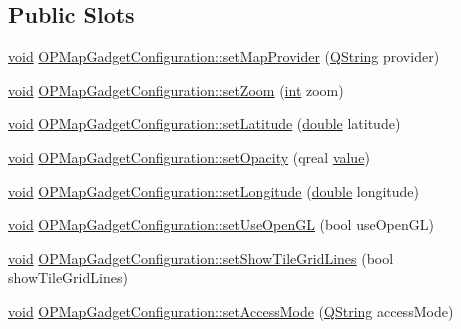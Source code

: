 \subsection*{Public Slots}
\begin{DoxyCompactItemize}
\item 
\hyperlink{group___u_a_v_objects_plugin_ga444cf2ff3f0ecbe028adce838d373f5c}{void} \hyperlink{group___o_p_map_plugin_gadde204abdb010d3db3f74c441e3b5f86}{O\-P\-Map\-Gadget\-Configuration\-::set\-Map\-Provider} (\hyperlink{group___u_a_v_objects_plugin_gab9d252f49c333c94a72f97ce3105a32d}{Q\-String} provider)
\item 
\hyperlink{group___u_a_v_objects_plugin_ga444cf2ff3f0ecbe028adce838d373f5c}{void} \hyperlink{group___o_p_map_plugin_ga890d5cb95e80f44a580a0e3ed6ff3be7}{O\-P\-Map\-Gadget\-Configuration\-::set\-Zoom} (\hyperlink{ioapi_8h_a787fa3cf048117ba7123753c1e74fcd6}{int} zoom)
\item 
\hyperlink{group___u_a_v_objects_plugin_ga444cf2ff3f0ecbe028adce838d373f5c}{void} \hyperlink{group___o_p_map_plugin_gab759e5b231114788ee1e2e86fcbdec91}{O\-P\-Map\-Gadget\-Configuration\-::set\-Latitude} (\hyperlink{_super_l_u_support_8h_a8956b2b9f49bf918deed98379d159ca7}{double} latitude)
\item 
\hyperlink{group___u_a_v_objects_plugin_ga444cf2ff3f0ecbe028adce838d373f5c}{void} \hyperlink{group___o_p_map_plugin_gac8ae59a00d15d1f1134b3908d4467567}{O\-P\-Map\-Gadget\-Configuration\-::set\-Opacity} (qreal \hyperlink{glext_8h_aa0e2e9cea7f208d28acda0480144beb0}{value})
\item 
\hyperlink{group___u_a_v_objects_plugin_ga444cf2ff3f0ecbe028adce838d373f5c}{void} \hyperlink{group___o_p_map_plugin_ga325a0c461cf8655200b500b27c814250}{O\-P\-Map\-Gadget\-Configuration\-::set\-Longitude} (\hyperlink{_super_l_u_support_8h_a8956b2b9f49bf918deed98379d159ca7}{double} longitude)
\item 
\hyperlink{group___u_a_v_objects_plugin_ga444cf2ff3f0ecbe028adce838d373f5c}{void} \hyperlink{group___o_p_map_plugin_gab274a818972885ce68aba549d8d6c683}{O\-P\-Map\-Gadget\-Configuration\-::set\-Use\-Open\-G\-L} (bool use\-Open\-G\-L)
\item 
\hyperlink{group___u_a_v_objects_plugin_ga444cf2ff3f0ecbe028adce838d373f5c}{void} \hyperlink{group___o_p_map_plugin_ga4463bef2ed6bd9bd5c0048b1a4510fa1}{O\-P\-Map\-Gadget\-Configuration\-::set\-Show\-Tile\-Grid\-Lines} (bool show\-Tile\-Grid\-Lines)
\item 
\hyperlink{group___u_a_v_objects_plugin_ga444cf2ff3f0ecbe028adce838d373f5c}{void} \hyperlink{group___o_p_map_plugin_ga5d483b0cef7387c2a4bb3df4a27b453f}{O\-P\-Map\-Gadget\-Configuration\-::set\-Access\-Mode} (\hyperlink{group___u_a_v_objects_plugin_gab9d252f49c333c94a72f97ce3105a32d}{Q\-String} access\-Mode)

\end{DoxyCompactItemize}

